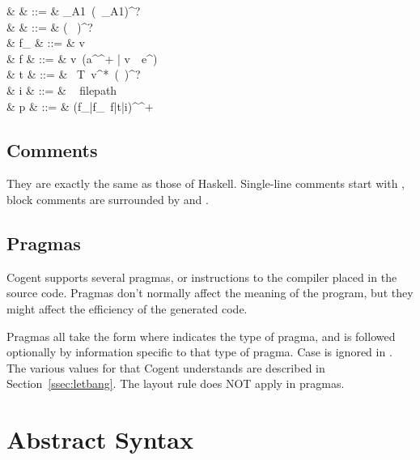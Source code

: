 \documentclass[a4paper]{article}
\newcommand{\cogent}{Cogent\xspace}
\begin{document}
\begin{grammar}
                    & \tau         & ::= & \tau_{A1}\ (\code{->}\ \tau_{A1})^? \\  
                    & \sigma       & ::= & (\  )^?\ \tau\\
           & f_{\sigma}   & ::= & v\ \code{:}\ \sigma \\
          & f            & ::= & v\ ({a^{}}^+ | v\ \code{=}\ e^{})  \\
              & t            & ::= & \ T\ v^*\ (\code{=}\ \tau)^? \\
                      & i            & ::= & \  filepath  \\
                      & p            & ::= & {(f_{\sigma}|f_{\sigma}\ f|t|i)^{}}^+
\end{grammar}

\subsection{Comments}
They are exactly the same as those of Haskell. Single-line comments start with \code{-}\code{-}, block comments are surrounded by \code{\{-} and \code{-\}}.

\subsection{Pragmas}

\cogent supports several pragmas, or instructions to the compiler placed in the source code. Pragmas don't normally affect the meaning of the program, but they might affect the efficiency of the generated code.

Pragmas all take the form  where  indicates the type of pragma, and is followed optionally by information specific to that type of pragma. Case is ignored in . The various values for  that \cogent understands are described in Section~\ref{ssec:letbang}. The layout rule does NOT apply in pragmas.


\section{Abstract Syntax}
\end{document}
